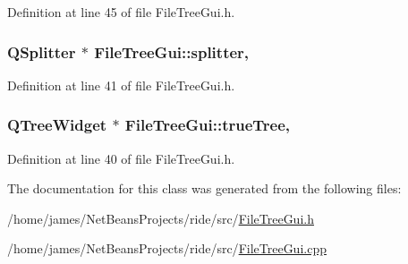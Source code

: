Definition at line 45 of file File\-Tree\-Gui.\-h.

\hypertarget{class_file_tree_gui_a43e8677ba8c50059d003f298b631e131}{
\subsubsection[{splitter}]{\setlength{\rightskip}{0pt plus 5cm}Q\-Splitter $\ast$ File\-Tree\-Gui\-::splitter\hspace{0.3cm}{\ttfamily [static]}, {\ttfamily [private]}}}\label{class_file_tree_gui_a43e8677ba8c50059d003f298b631e131}


Definition at line 41 of file File\-Tree\-Gui.\-h.

\hypertarget{class_file_tree_gui_a27648a2d00b8283605c3a260060b1285}{
\subsubsection[{true\-Tree}]{\setlength{\rightskip}{0pt plus 5cm}Q\-Tree\-Widget $\ast$ File\-Tree\-Gui\-::true\-Tree\hspace{0.3cm}{\ttfamily [static]}, {\ttfamily [private]}}}\label{class_file_tree_gui_a27648a2d00b8283605c3a260060b1285}


Definition at line 40 of file File\-Tree\-Gui.\-h.



The documentation for this class was generated from the following files\-:\begin{DoxyCompactItemize}
\item 
/home/james/\-Net\-Beans\-Projects/ride/src/\hyperlink{_file_tree_gui_8h}{File\-Tree\-Gui.\-h}\item 
/home/james/\-Net\-Beans\-Projects/ride/src/\hyperlink{_file_tree_gui_8cpp}{File\-Tree\-Gui.\-cpp}\end{DoxyCompactItemize}
